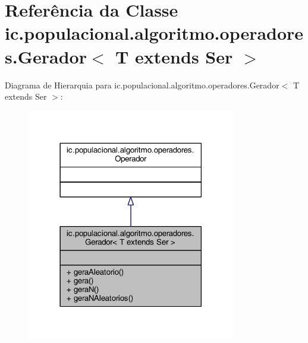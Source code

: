 \hypertarget{classic_1_1populacional_1_1algoritmo_1_1operadores_1_1_gerador_3_01_t_01extends_01_ser_01_4}{\section{Referência da Classe ic.\-populacional.\-algoritmo.\-operadores.\-Gerador$<$ T extends Ser $>$}
\label{classic_1_1populacional_1_1algoritmo_1_1operadores_1_1_gerador_3_01_t_01extends_01_ser_01_4}
}


Diagrama de Hierarquia para ic.\-populacional.\-algoritmo.\-operadores.\-Gerador$<$ T extends Ser $>$\-:\nopagebreak
\begin{figure}[H]
\begin{center}
\leavevmode
\includegraphics[width=258pt]{classic_1_1populacional_1_1algoritmo_1_1operadores_1_1_gerador_3_01_t_01extends_01_ser_01_4__inherit__graph}
\end{center}
\end{figure}


